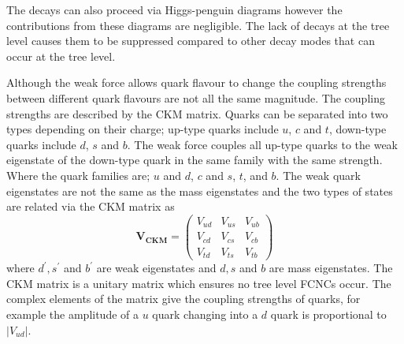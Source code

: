 The decays can also proceed via Higgs-penguin diagrams however the contributions from these diagrams are negligible. %
The lack of \bmumu decays at the tree level causes them to be suppressed compared to other \bsd decay modes that can occur at the tree level.





Although the weak force allows quark flavour to change the coupling strengths between different quark flavours are not all the same magnitude. The coupling strengths are described by the CKM matrix. Quarks can be separated into two types depending on their charge; up-type quarks include $u$, $c$ and $t$, down-type quarks include $d$, $s$ and $b$. The weak force couples all up-type quarks to the weak eigenstate of the down-type quark in the same family with the same strength. Where the quark families are; $u$ and $d$, $c$ and $s$, $t$, and $b$. The weak quark eigenstates are not the same as the mass eigenstates and the two types of states are related via the CKM matrix as
\begin{equation}
\mathbf{V_{CKM}} =
 \begin{pmatrix}
   V_{ud} & V_{us} & V_{ub} \\
   V_{cd} & V_{cs} & V_{cb} \\
   V_{td} & V_{ts} & V_{tb}
 \end{pmatrix}
\label{eq:CKMA}
\end{equation}
where $d^', s^'$ and $b^'$ are weak eigenstates and $d, s$ and $b$ are mass eigenstates. The CKM matrix is a unitary matrix which ensures no tree level FCNCs occur. The complex elements of the matrix give the coupling strengths of quarks, for example the amplitude of a $u$ quark changing into a $d$ quark is proportional to $|V_{ud}|$.

